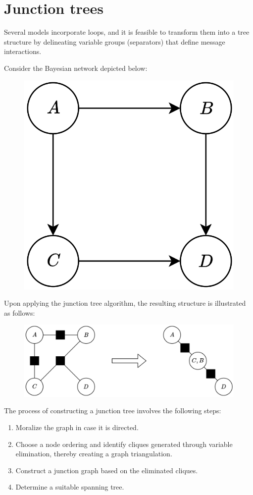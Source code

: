 \section{Junction trees}

Several models incorporate loops, and it is feasible to transform them into a tree structure by delineating variable groups (separators) that define message interactions.
\begin{example}
    Consider the Bayesian network depicted below:
    \begin{figure}[H]
        \centering
        \includegraphics[width=0.25\linewidth]{images/jt.png}
    \end{figure}
    Upon applying the junction tree algorithm, the resulting structure is illustrated as follows:
    \begin{figure}[H]
        \centering
        \includegraphics[width=0.5\linewidth]{images/jt1.png}
    \end{figure}
\end{example}
The process of constructing a junction tree involves the following steps:
\begin{enumerate}
    \item Moralize the graph in case it is directed.
    \item Choose a node ordering and identify cliques generated through variable elimination, thereby creating a graph triangulation.
    \item Construct a junction graph based on the eliminated cliques.
    \item Determine a suitable spanning tree.
\end{enumerate}